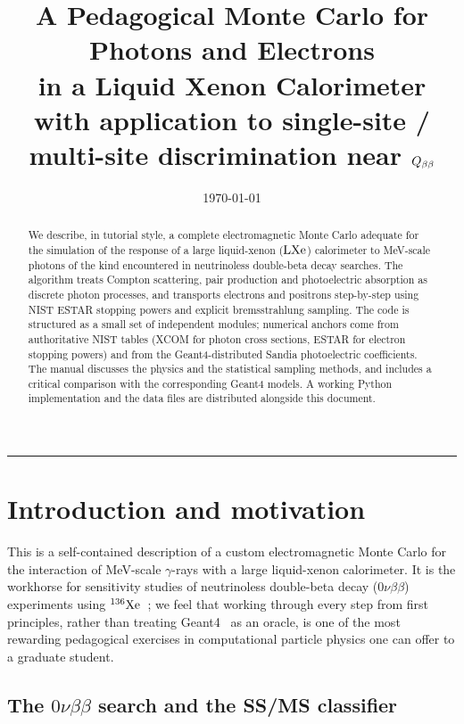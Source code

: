 \documentclass[11pt,a4paper]{article}
\title{\bfseries A Pedagogical Monte Carlo for Photons and Electrons \\
       in a Liquid Xenon Calorimeter \\[6pt]
       \large with application to single-site / multi-site
       discrimination near $Q_{\beta\beta}$}
\author{}
\date{\today}
\newcommand{\zeronubb}{0\nu\beta\beta}
\begin{document}
\maketitle

\begin{abstract}\noindent
We describe, in tutorial style, a complete electromagnetic Monte Carlo
adequate for the simulation of the response of a large liquid-xenon
($\rm LXe$) calorimeter to MeV-scale photons of the kind encountered
in neutrinoless double-beta decay searches. The algorithm treats
Compton scattering, pair production and photoelectric absorption as
discrete photon processes, and transports electrons and positrons
step-by-step using NIST ESTAR stopping powers and explicit
bremsstrahlung sampling. The code is structured as a small set of
independent modules; numerical anchors come from authoritative NIST
tables (XCOM for photon cross sections, ESTAR for electron stopping
powers) and from the Geant4-distributed Sandia photoelectric
coefficients. The manual discusses the physics and the statistical
sampling methods, and includes a critical comparison with the
corresponding {\sc Geant4} models. A working Python implementation
and the data files are distributed alongside this document.
\end{abstract}

\tableofcontents
\bigskip\hrule\bigskip

\section{Introduction and motivation}\label{sec:intro}

This is a self-contained description of a custom electromagnetic
Monte Carlo for the interaction of MeV-scale $\gamma$-rays with a
large liquid-xenon calorimeter. It is the workhorse for sensitivity
studies of neutrinoless double-beta decay ($\zeronubb$) experiments
using $\rm{}^{136}Xe$~\cite{LZ,nEXO,EXO200,NEXT}; we feel that
working through every step from first principles, rather than
treating {\sc Geant4}~\cite{G4-1,G4-PRM} as an oracle, is one of the
most rewarding pedagogical exercises in computational particle
physics one can offer to a graduate student.

\subsection{The $\zeronubb$ search and the SS/MS classifier}
\end{document}
